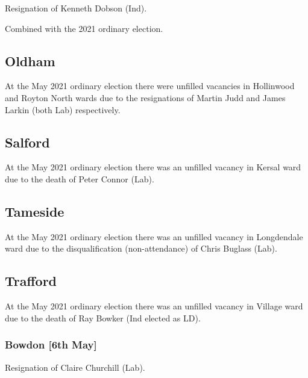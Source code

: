 \documentclass[a4paper,openany]{book}
\begin{document}
\begin{resultsiii}
Resignation of Kenneth Dobson (Ind).

Combined with the 2021 ordinary election.

\subsection*{Oldham}

At the May 2021 ordinary election there were unfilled vacancies in Hollinwood and Royton North wards due to the resignations of Martin Judd and James Larkin (both Lab) respectively.

\subsection*{Salford}

At the May 2021 ordinary election there was an unfilled vacancy in Kersal ward due to the death of Peter Connor (Lab).

\subsection*{Tameside}

At the May 2021 ordinary election there was an unfilled vacancy in Longdendale ward due to the disqualification (non-attendance) of Chris Buglass (Lab).

\subsection*{Trafford}

At the May 2021 ordinary election there was an unfilled vacancy in Village ward due to the death of Ray Bowker (Ind elected as LD).

\subsubsection*{Bowdon \hspace*{\fill}\nolinebreak[1]%
	\enspace\hspace*{\fill}
	[6th May]}


Resignation of Claire Churchill (Lab).


\end{resultsiii}
\end{document}
